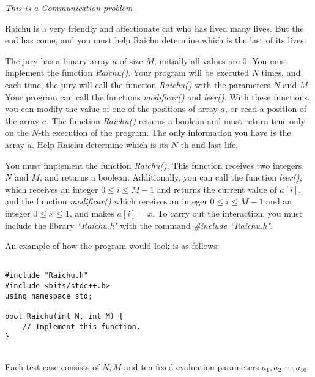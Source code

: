 \documentclass[12pt]{scrartcl}
\begin{document}
    
    {\itshape This is a Communication problem}
    
    \vspace{10pt}

        Raichu is a very friendly and affectionate cat who has lived many lives. But the end has come, and you must help Raichu determine which is the last of its lives.


        The jury has a binary array $a$ of size $M$, initially all values are $0$. You must implement the function {\itshape Raichu()}. Your program will be executed $N$ times, and each time, the jury will call the function {\itshape Raichu()} with the parameters $N$ and $M$. Your program can call the functions {\itshape modificar()} and {\itshape leer()}. With these functions, you can modify the value of one of the positions of array $a$, or read a position of the array $a$. The function {\itshape Raichu()} returns a boolean and must return true only on the $N$-th execution of the program. The only information you have is the array $a$. Help Raichu determine which is its $N$-th and last life.


        You must implement the function {\itshape Raichu()}. This function receives two integers, $N$ and $M$, and returns a boolean. Additionally, you can call the function {\itshape leer()}, which receives an integer $0 \le i \le M - 1$ and returns the current value of $a[i]$, and the function {\itshape modificar()} which receives an integer $0 \le i \le M - 1$ and an integer $0 \le x \le 1$, and makes $a[i] = x$.
        To carry out the interaction, you must include the library \textit{``Raichu.h"} with the command \textit{\#include ``Raichu.h"}.

        An example of how the program would look is as follows:

\begin{verbatim}

#include "Raichu.h"
#include <bits/stdc++.h>
using namespace std;

bool Raichu(int N, int M) {
    // Implement this function.
}
    
\end{verbatim}
    


        Each test case consists of $N, M$ and ten fixed evaluation parameters $a_1, a_2, \cdots, a_{10}$.
\end{document}
